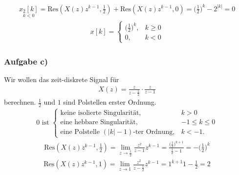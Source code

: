 \documentclass[11pt,a4paper,DIV=12]{scrartcl}
\begin{document}
\begin{align}
	\underset{k<0}{x_2[k]}=\mathrm{Res}(X(z)z^{k-1},\frac{1}{2})+\mathrm{Res}(X(z)z^{k-1},0)=\bigg ( \frac{1}{2} \bigg)^k-2^{|k|}=0
\end{align}
\begin{align}
	x[k]=
	\begin{cases}
		\bigg (\frac{1}{2} \bigg)^k, &k\geq0 \\
		0, &k<0
	\end{cases}
\end{align}
\subsubsection{Aufgabe c)}
Wir wollen das zeit-diskrete Signal für
\begin{align}
	X(z)=\frac{z}{z-\frac{1}{2}}\cdot\frac{z}{z-1}
\end{align}
berechnen.
$\frac{1}{2}$ und $1$ sind Polstellen erster Ordnung.
\begin{align}
	0\text{ ist }
	\begin{cases}
		\text{keine isolierte Singularität}, &k>0 \\
		\text{eine hebbare Singularität}, &-1\leq k \leq0 \\
		\text{eine Polstelle }(|k|-1)\text{-ter Ordnung}, &k < -1.
	\end{cases}
\end{align}
\begin{align}
	\mathrm{Res}(X(z)z^{k-1},\frac{1}{2})=\lim\limits_{z\rightarrow\frac{1}{2}}\frac{z^2}{z-1}z^{k-1}=\frac{\bigg (\frac{1}{2}\bigg)^{k+1}}{\frac{1}{2}-1}=-\bigg (\frac{1}{2}\bigg)^k
\end{align}
\begin{align}
	\mathrm{Res}(X(z)z^{k-1},1)=\lim\limits_{z\rightarrow1}\frac{z^2}{z-\frac{1}{2}}z^{k-1}=1^{k+1}{1-\frac{1}{2}}=2
\end{align}
\end{document}
